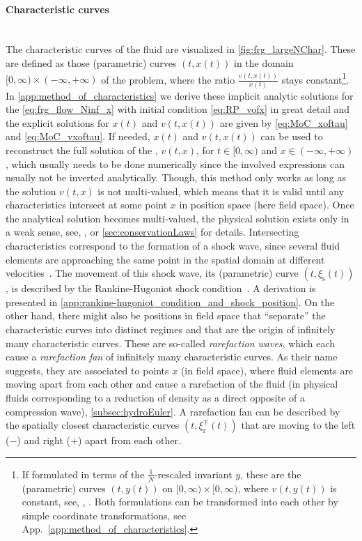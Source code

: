 \paragraph{Characteristic curves}\label{paragraph:largeNchars}\mbox{}\\%
The characteristic curves of the fluid are visualized in \cref{fig:frg_largeNChar}.
These are defined as those (parametric) curves $( t, x ( t ) )$ in the domain $[ 0, \infty ) \times ( - \infty, + \infty )$ of the problem, where the ratio $\frac{v ( t, x ( t ))}{x ( t )}$ stays constant\footnote{If formulated in terms of the $\frac{1}{N}$-rescaled invariant $y$, these are the (parametric) curves $( t, y ( t ) )$ on $[ 0, \infty ) \times [ 0, \infty )$, where $v ( t, y ( t ))$ is constant, see, \eg{}, . Both formulations can be transformed into each other by simple coordinate transformations, see App.~\ref{app:method_of_characteristics}.}.
In \cref{app:method_of_characteristics} we derive these implicit analytic solutions for the \pde{} \eqref{eq:frg_flow_Ninf_x} with initial condition \eqref{eq:RP_vofx} in great detail and the explicit solutions for $x ( t )$ and $v ( t, x ( t ))$ are given by \cref{eq:MoC_xoftau} and \eqref{eq:MoC_vxoftau}. 
If needed, $x ( t )$ and $v ( t, x ( t ))$ can be used to reconstruct the full solution of the \pde{}, $v ( t, x )$, for $t \in [ 0, \infty )$ and $x \in ( - \infty, + \infty )$, which usually needs to be done numerically since the involved expressions can usually not be inverted analytically. 
Though, this method only works as long as the solution $v ( t, x )$ is not multi-valued, which means that it is valid until any characteristics intersect at some point $x$ in position space  (here field space).
Once the analytical solution becomes multi-valued, the physical solution exists only in a weak sense, see, \eg{},  or \cref{sec:conservationLaws} for details. Intersecting characteristics correspond to the formation of a shock wave, since several fluid elements are approaching the same point in the spatial domain at different velocities~\cite{Ames:1992,LeVeque:1992,LeVeque:2002,Hesthaven2007,RezzollaZanotti:2013}. 
The movement of this shock wave, its (parametric) curve $( t, \xi_\mathrm{s} ( t ) )$, is described by the Rankine-Hugoniot shock condition~\cite{Rankine:1870,Hugoniot:1887}.
A derivation is presented in \cref{app:rankine-hugoniot_condition_and_shock_position}.
On the other hand, there might also be positions in field space that ``separate'' the characteristic curves into distinct regimes and that are the origin of infinitely many characteristic curves. 
These are so-called \textit{rarefaction waves}, which each cause a \textit{rarefaction fan} of infinitely many characteristic curves. As their name suggests, they are associated to points $x$ (in field space), where fluid elements are moving apart from each other and cause a rarefaction of the fluid (in physical fluids corresponding to a reduction of density as a direct opposite of a compression wave), \cf{} \cref{subsec:hydroEuler}.
A rarefaction fan can be described by the spatially closest characteristic curves  $( t, \xi^\mp_\mathrm{r} ( t ) )$ that are moving to the left ($-$) and right ($+$) apart from each other.

